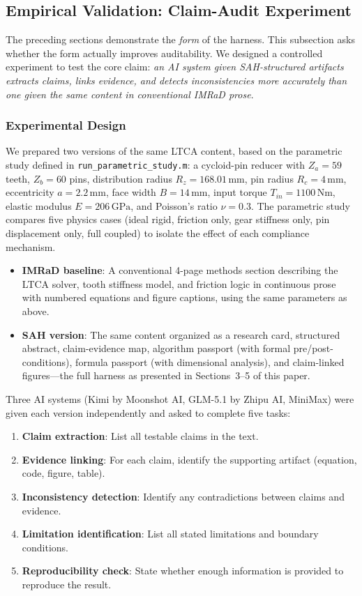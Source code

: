 \documentclass{article}
\newcommand{\revmark}{\marginpar{\footnotesize\textcolor{blue}{\textbf{Rev.\,2}}}}
\begin{document}
\subsection{Empirical Validation: Claim-Audit Experiment}\revmark

The preceding sections demonstrate the \emph{form} of the harness. This subsection asks whether the form actually improves auditability. We designed a controlled experiment to test the core claim: \emph{an AI system given SAH-structured artifacts extracts claims, links evidence, and detects inconsistencies more accurately than one given the same content in conventional IMRaD prose}.

\subsubsection{Experimental Design}
We prepared two versions of the same LTCA content, based on the parametric study defined in \texttt{run\_parametric\_study.m}: a cycloid-pin reducer with $Z_a = 59$ teeth, $Z_b = 60$ pins, distribution radius $R_z = 168.01\,\mathrm{mm}$, pin radius $R_c = 4\,\mathrm{mm}$, eccentricity $a = 2.2\,\mathrm{mm}$, face width $B = 14\,\mathrm{mm}$, input torque $T_{in} = 1100\,\mathrm{Nm}$, elastic modulus $E = 206\,\mathrm{GPa}$, and Poisson's ratio $\nu = 0.3$. The parametric study compares five physics cases (ideal rigid, friction only, gear stiffness only, pin displacement only, full coupled) to isolate the effect of each compliance mechanism.

\begin{itemize}
    \item \textbf{IMRaD baseline}: A conventional 4-page methods section describing the LTCA solver, tooth stiffness model, and friction logic in continuous prose with numbered equations and figure captions, using the same parameters as above.
    \item \textbf{SAH version}: The same content organized as a research card, structured abstract, claim-evidence map, algorithm passport (with formal pre/post-conditions), formula passport (with dimensional analysis), and claim-linked figures---the full harness as presented in Sections~3--5 of this paper.
\end{itemize}

Three AI systems (Kimi by Moonshot AI, GLM-5.1 by Zhipu AI, MiniMax) were given each version independently and asked to complete five tasks:
\begin{enumerate}
    \item \textbf{Claim extraction}: List all testable claims in the text.
    \item \textbf{Evidence linking}: For each claim, identify the supporting artifact (equation, code, figure, table).
    \item \textbf{Inconsistency detection}: Identify any contradictions between claims and evidence.
    \item \textbf{Limitation identification}: List all stated limitations and boundary conditions.
    \item \textbf{Reproducibility check}: State whether enough information is provided to reproduce the result.
\end{enumerate}
\end{document}
